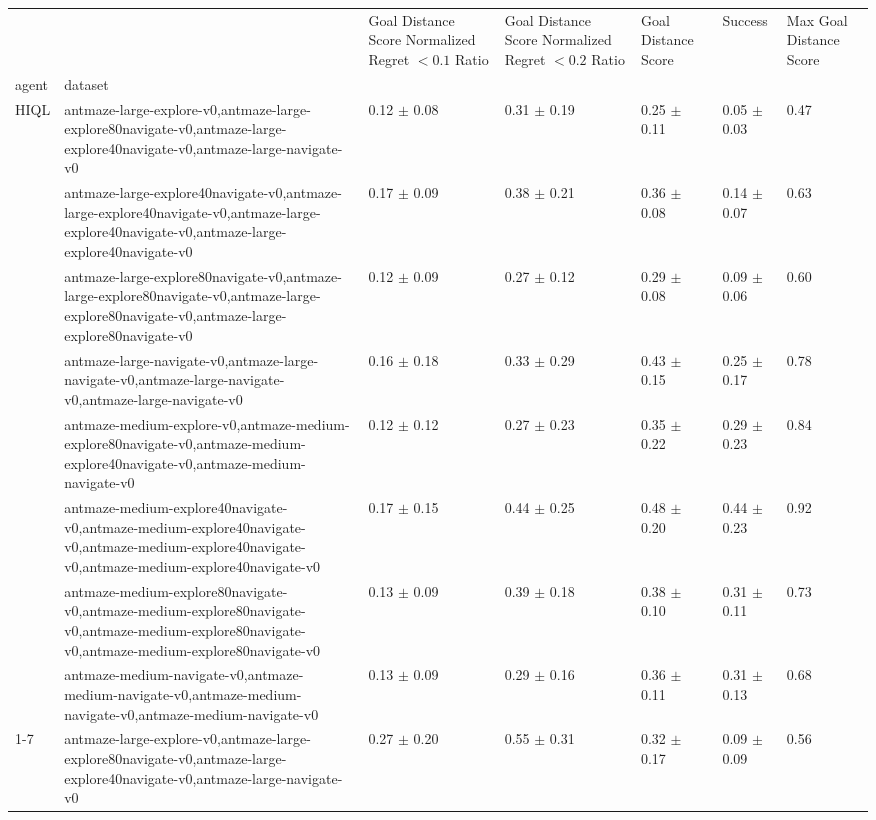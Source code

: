 \begin{tabular}{lllllll}
\toprule
 &  & Goal Distance Score Normalized Regret $< 0.1$ Ratio & Goal Distance Score Normalized Regret $< 0.2$ Ratio & Goal Distance Score & Success & Max Goal Distance Score \\
agent & dataset &  &  &  &  &  \\
\midrule
\multirow[t]{8}{*}{HIQL} & antmaze-large-explore-v0,antmaze-large-explore80navigate-v0,antmaze-large-explore40navigate-v0,antmaze-large-navigate-v0 & 0.12 $\pm$ 0.08 & 0.31 $\pm$ 0.19 & 0.25 $\pm$ 0.11 & 0.05 $\pm$ 0.03 & 0.47 \\
 & antmaze-large-explore40navigate-v0,antmaze-large-explore40navigate-v0,antmaze-large-explore40navigate-v0,antmaze-large-explore40navigate-v0 & 0.17 $\pm$ 0.09 & 0.38 $\pm$ 0.21 & 0.36 $\pm$ 0.08 & 0.14 $\pm$ 0.07 & 0.63 \\
 & antmaze-large-explore80navigate-v0,antmaze-large-explore80navigate-v0,antmaze-large-explore80navigate-v0,antmaze-large-explore80navigate-v0 & 0.12 $\pm$ 0.09 & 0.27 $\pm$ 0.12 & 0.29 $\pm$ 0.08 & 0.09 $\pm$ 0.06 & 0.60 \\
 & antmaze-large-navigate-v0,antmaze-large-navigate-v0,antmaze-large-navigate-v0,antmaze-large-navigate-v0 & 0.16 $\pm$ 0.18 & 0.33 $\pm$ 0.29 & 0.43 $\pm$ 0.15 & 0.25 $\pm$ 0.17 & 0.78 \\
 & antmaze-medium-explore-v0,antmaze-medium-explore80navigate-v0,antmaze-medium-explore40navigate-v0,antmaze-medium-navigate-v0 & 0.12 $\pm$ 0.12 & 0.27 $\pm$ 0.23 & 0.35 $\pm$ 0.22 & 0.29 $\pm$ 0.23 & 0.84 \\
 & antmaze-medium-explore40navigate-v0,antmaze-medium-explore40navigate-v0,antmaze-medium-explore40navigate-v0,antmaze-medium-explore40navigate-v0 & 0.17 $\pm$ 0.15 & 0.44 $\pm$ 0.25 & 0.48 $\pm$ 0.20 & 0.44 $\pm$ 0.23 & 0.92 \\
 & antmaze-medium-explore80navigate-v0,antmaze-medium-explore80navigate-v0,antmaze-medium-explore80navigate-v0,antmaze-medium-explore80navigate-v0 & 0.13 $\pm$ 0.09 & 0.39 $\pm$ 0.18 & 0.38 $\pm$ 0.10 & 0.31 $\pm$ 0.11 & 0.73 \\
 & antmaze-medium-navigate-v0,antmaze-medium-navigate-v0,antmaze-medium-navigate-v0,antmaze-medium-navigate-v0 & 0.13 $\pm$ 0.09 & 0.29 $\pm$ 0.16 & 0.36 $\pm$ 0.11 & 0.31 $\pm$ 0.13 & 0.68 \\
\cline{1-7}
\multirow[t]{8}{*}{QRL} & antmaze-large-explore-v0,antmaze-large-explore80navigate-v0,antmaze-large-explore40navigate-v0,antmaze-large-navigate-v0 & 0.27 $\pm$ 0.20 & 0.55 $\pm$ 0.31 & 0.32 $\pm$ 0.17 & 0.09 $\pm$ 0.09 & 0.56 \\

\end{tabular}
